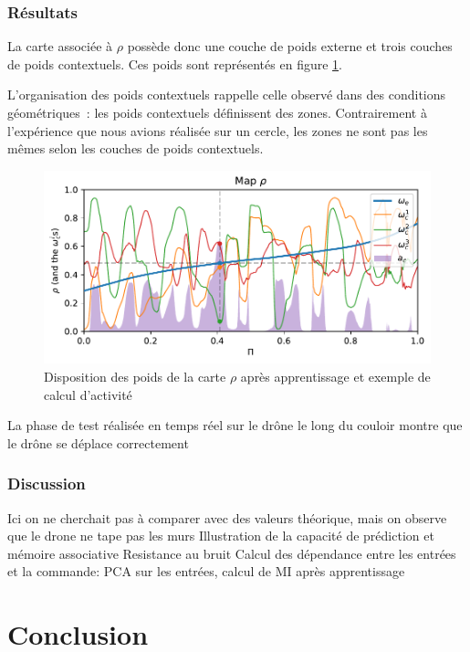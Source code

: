\documentclass[../main]{subfiles}
\begin{document}
\subsubsection{Résultats}

La carte associée à $\rho$ possède donc une couche de poids externe et trois couches de poids contextuels. Ces poids sont représentés en figure \ref{fig:drone_w}. 

L'organisation des poids contextuels rappelle celle observé dans des conditions géométriques~: les poids contextuels définissent des zones. 
Contrairement à l'expérience que nous avions réalisée sur un cercle, les zones ne sont pas les mêmes selon les couches de poids contextuels.

\begin{figure}
\includegraphics[width=\textwidth]{dronemap}
\caption{Disposition des poids de la carte $\rho$ après apprentissage et exemple de calcul d'activité}
\label{fig:drone_w}
\end{figure}

La phase de test réalisée en temps réel sur le drône le long du couloir montre que le drône se déplace correctement 

\subsubsection{Discussion}


Ici on ne cherchait pas à comparer avec des valeurs théorique, mais on observe que le drone ne tape pas les murs
Illustration de la capacité de prédiction et mémoire associative
Resistance au bruit
Calcul des dépendance entre les entrées et la commande:
PCA sur les entrées, calcul de MI après apprentissage

\section{Conclusion}


\ifSubfilesClassLoaded{
    \printbibliography
}{}
\end{document}
